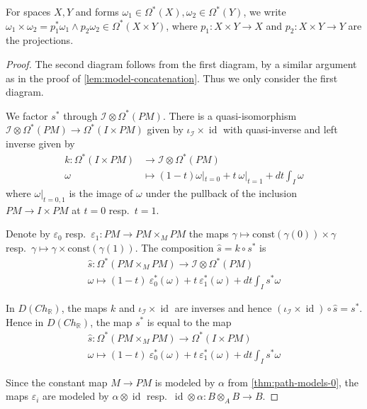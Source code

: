 \documentclass{scrartcl}
\theoremstyle{plain}
\theoremstyle{definition}
\newcommand{\R}{\mathbb R}
\renewcommand{\epsilon}{\varepsilon}
\DeclareMathOperator{\id}{id}
\newcommand{\comp}{\mathbin{\circ}}
\begin{document}
For spaces $X, Y$ and forms $\omega_1\in\Omega^*(X), \omega_2\in\Omega^*(Y)$, we write $\omega_1\times\omega_2 = p_1^*\omega_1 \wedge p_2\omega_2\in\Omega^*(X\times Y)$, where $p_1\colon X\times Y\to X$ and $p_2\colon X\times Y\to Y$ are the projections.
\begin{proof}
    The second diagram follows from the first diagram, by a similar argument as in the proof of \cref{lem:model-concatenation}. Thus we only consider the first diagram.

    We factor $s^*$ through $\mathcal I\otimes \Omega^*(PM)$. There is a quasi-isomorphism $\mathcal I\otimes\Omega^*(PM)\to \Omega^*(I\times PM)$ given by $\iota_{\mathcal I}\times\id$ with quasi-inverse and left inverse given by 
    \begin{align*}
        k\colon\Omega^*(I\times PM) &\to \mathcal I \otimes \Omega^*(PM) \\
        \omega & \mapsto (1-t)\omega|_{t=0} + t\ \omega|_{t=1} + dt \int_I \omega
    \end{align*}
    where $\omega|_{t=0,1}$ is the image of $\omega$ under the pullback of the inclusion $PM\to I\times PM$ at $t=0$ resp.\ $t=1$.

    Denote by $\epsilon_{0}$ resp.\ $\epsilon_1\colon PM\to PM\times_M PM$ the maps $\gamma\mapsto \mathrm{const}(\gamma(0))\times \gamma$ resp.\ $\gamma\mapsto \gamma\times \mathrm{const}(\gamma(1))$. The composition $\hat s = k\comp s^*$ is
    \begin{align*}
        \hat s\colon \Omega^*(PM\times_M PM)\to \mathcal I\otimes\Omega^*(PM)\\
        \omega \mapsto (1-t)\ \epsilon_0^*(\omega) + t\ \epsilon_1^*(\omega) + dt \int_I s^*\omega
    \end{align*}

    In $D(Ch_{\R})$, the maps $k$ and $\iota_{\mathcal I}\times \id$ are inverses and hence $(\iota_{\mathcal I}\times \id)\comp \hat s = s^*$. Hence in $D(Ch_{\R})$, the map $s^*$ is  equal to the map
    \begin{align*}
        \hat s\colon \Omega^*(PM\times_M PM)\to \Omega^*(I\times PM)\\
        \omega \mapsto (1-t)\ \epsilon_0^*(\omega) + t\ \epsilon_1^*(\omega) + dt \int_I s^*\omega
    \end{align*}

    Since the constant map $M\to PM$ is modeled by $\alpha$ from \cref{thm:path-models-0}, the maps $\epsilon_i$ are modeled by $\alpha\otimes\id$ resp.\ $\id\otimes\alpha\colon B\otimes_A B\to B$.
    

\end{proof}
\end{document}
